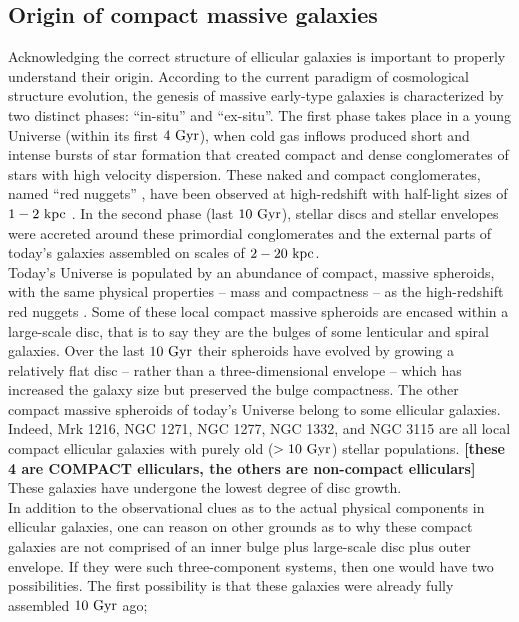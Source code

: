\documentclass[useAMS,usenatbib,article]{mn2e}
\begin{document}
\subsection{Origin of compact massive galaxies}
Acknowledging the correct structure of ellicular galaxies is important to properly understand their origin. 
According to the current paradigm of cosmological structure evolution, 
the genesis of massive early-type galaxies is characterized by two distinct phases: ``in-situ'' and ``ex-situ''. 
The first phase takes place in a young Universe (within its first $4~\rm Gyr$), 
when cold gas inflows produced short and intense bursts of star formation 
that created compact and dense conglomerates of stars with high velocity dispersion. 
These naked and compact conglomerates, named ``red nuggets'' \citep{damjanov2009}, 
have been observed at high-redshift with half-light sizes of $1-2~\rm kpc$ \citep{daddi2005,trujillo2006,vandokkum2008}.
In the second phase (last $10~\rm Gyr$), stellar discs and stellar envelopes 
were accreted around these primordial conglomerates and the external parts of today's galaxies assembled on scales of $2-20~\rm kpc$. \\
Today's Universe is populated by an abundance of compact, massive spheroids, 
with the same physical properties -- mass and compactness -- as the high-redshift red nuggets \citep{graham2013review,GDS2015}. 
Some of these local compact massive spheroids are encased within a large-scale disc, 
that is to say they are the bulges of some lenticular and spiral galaxies. 
Over the last $10~\rm Gyr$ their spheroids have evolved by growing a relatively flat disc -- 
rather than a three-dimensional envelope -- 
which has increased the galaxy size but preserved the bulge compactness. 
The other compact massive spheroids of today's Universe belong to some ellicular galaxies. 
Indeed, Mrk 1216, NGC 1271, NGC 1277, NGC 1332, and NGC 3115 are all local compact ellicular galaxies 
with purely old ($>10~\rm Gyr$) stellar populations. {\bf [these 4 are COMPACT elliculars, the others are non-compact elliculars]}
These galaxies have undergone the lowest degree of disc growth. \\
In addition to the observational clues as to the actual physical components in ellicular galaxies, 
one can reason on other grounds as to why these compact galaxies are not comprised of an inner bulge 
plus large-scale disc plus outer envelope. 
If they were such three-component systems, then one would have two possibilities. 
The first possibility is that these galaxies were already fully assembled $10~\rm Gyr$ ago; 
\end{document}
